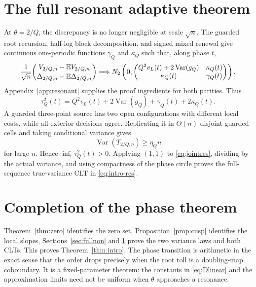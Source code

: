 \documentclass[11pt]{article}
\numberwithin{equation}{section}
\theoremstyle{definition}\newtheorem{definition}[theorem]{Definition}
\theoremstyle{remark}\newtheorem{remark}[theorem]{Remark}
\newcommand{\E}{\mathbb E}\newcommand{\Pp}{\mathbb P}
\newcommand{\Var}{\operatorname {Var}}\newcommand{\Cov}{\operatorname {Cov}}
\newcommand{\1}{\mathbf 1}\newcommand{\cD}{\mathcal D}
\begin{document}
\section{The full resonant adaptive theorem}\label{sec:fullres}
At $\theta=2/Q$, the discrepancy is no longer negligible at scale $\sqrt n$.
The guarded root recursion, half-log block decomposition, and signed mixed
renewal give continuous one-periodic functions $\gamma_Q$ and $\kappa_Q$
such that, along phase $t$,
\begin{equation}
 {1\over\sqrt n}\binom{V_{2/Q,n}-\E V_{2/Q,n}}
 {\Delta_{2/Q,n}-\E\Delta_{2/Q,n}}\Longrightarrow
 N_2\left(0,\begin{pmatrix}
 Q^2v_L(t)+2\Var(g_Q)&\kappa_Q(t)\\
 \kappa_Q(t)&\gamma_Q(t)
 \end{pmatrix}\right).                                      \label{eq:jointres}
\end{equation}
Appendix~\ref{app:resonant} supplies the proof ingredients for both parities.
Thus
\begin{equation}
 \tau_Q^2(t)=Q^2v_L(t)+2\Var(g_Q)+\gamma_Q(t)+2\kappa_Q(t).    \label{eq:tau}
\end{equation}
A guarded three-point source has two open configurations with different
local costs, while all exterior decisions agree.  Replicating it in
$\Theta(n)$ disjoint guarded cells and taking conditional variance gives
\begin{equation}\Var(T_{2/Q,n})\ge\eta_Qn                       \label{eq:lower}
\end{equation}
for large $n$.  Hence $\inf_t\tau_Q^2(t)>0$.  Applying $(1,1)$ to
\eqref{eq:jointres}, dividing by the actual variance, and using compactness
of the phase circle proves the full-sequence true-variance CLT in
\eqref{eq:intro-res}.

\clearpage
\section{Completion of the phase theorem}\label{sec:completion}
Theorem~\ref{thm:zero} identifies the zero set, Proposition~\ref{prop:cusp}
identifies the local slopes, Sections~\ref{sec:fullnon} and
\ref{sec:fullres} prove the two variance laws and both CLTs.  This proves
Theorem~\ref{thm:intro}.  The phase transition is arithmetic in the exact
sense that the order drops precisely when the root toll is a doubling-map
coboundary.  It is a fixed-parameter theorem: the constants in
\eqref{eq:Dlinear} and the approximation limits need not be uniform when
$\theta$ approaches a resonance.
\end{document}
